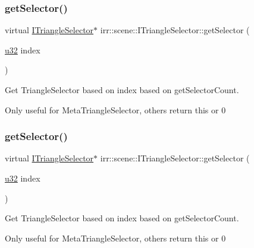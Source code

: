 \subsubsection{\texorpdfstring{get\+Selector()}{getSelector()}\hspace{0.1cm}{\footnotesize\ttfamily [1/4]}}
{\footnotesize\ttfamily virtual \hyperlink{classirr_1_1scene_1_1ITriangleSelector}{I\+Triangle\+Selector}$\ast$ irr\+::scene\+::\+I\+Triangle\+Selector\+::get\+Selector (\begin{DoxyParamCaption}\item[{\hyperlink{namespaceirr_a0416a53257075833e7002efd0a18e804}{u32}}]{index }\end{DoxyParamCaption})\hspace{0.3cm}{\ttfamily [pure virtual]}}



Get Triangle\+Selector based on index based on get\+Selector\+Count. 

Only useful for Meta\+Triangle\+Selector, others return \textquotesingle{}this\textquotesingle{} or 0 \mbox{\label{classirr_1_1scene_1_1ITriangleSelector_a51e15d33c41642441a311a33d2f1ebed}} 
\subsubsection{\texorpdfstring{get\+Selector()}{getSelector()}\hspace{0.1cm}{\footnotesize\ttfamily [2/4]}}
{\footnotesize\ttfamily virtual \hyperlink{classirr_1_1scene_1_1ITriangleSelector}{I\+Triangle\+Selector}$\ast$ irr\+::scene\+::\+I\+Triangle\+Selector\+::get\+Selector (\begin{DoxyParamCaption}\item[{\hyperlink{namespaceirr_a0416a53257075833e7002efd0a18e804}{u32}}]{index }\end{DoxyParamCaption})\hspace{0.3cm}{\ttfamily [pure virtual]}}



Get Triangle\+Selector based on index based on get\+Selector\+Count. 

Only useful for Meta\+Triangle\+Selector, others return \textquotesingle{}this\textquotesingle{} or 0 \mbox{\label{classirr_1_1scene_1_1ITriangleSelector_ad5d221ea393e67872c902d35e77fa69e}} 
